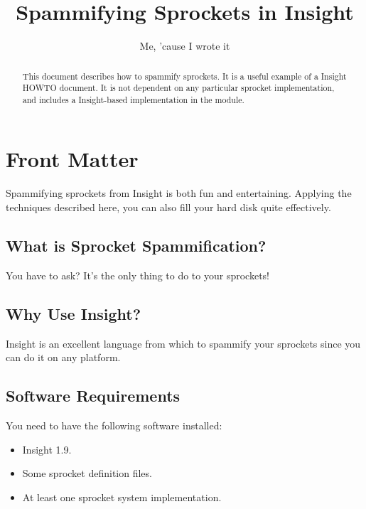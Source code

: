 \documentclass{InsightHowto}
\title{Spammifying Sprockets in Insight}
\author{Me, 'cause I wrote it}
\begin{document}
\maketitle

%


\ifhtml
\chapter*{Front Matter\label{front}}
\fi


\begin{abstract}
\noindent
This document describes how to spammify sprockets.  It is a useful
example of a Insight HOWTO document.  It is not dependent on any
particular sprocket implementation, and includes a Insight-based
implementation in the  module.
\end{abstract}

\tableofcontents

Spammifying sprockets from Insight is both fun and entertaining.
Applying the techniques described here, you can also fill your hard
disk quite effectively.

\section{What is Sprocket Spammification?}

You have to ask?  It's the only thing to do to your sprockets!


\section{Why Use Insight?}

Insight is an excellent language from which to spammify your sprockets
since you can do it on any platform.


\section{Software Requirements}

You need to have the following software installed:

\begin{itemize}
  \item  Insight 1.9.
  \item  Some sprocket definition files.
  \item  At least one sprocket system implementation.
\end{itemize}
\end{document}
